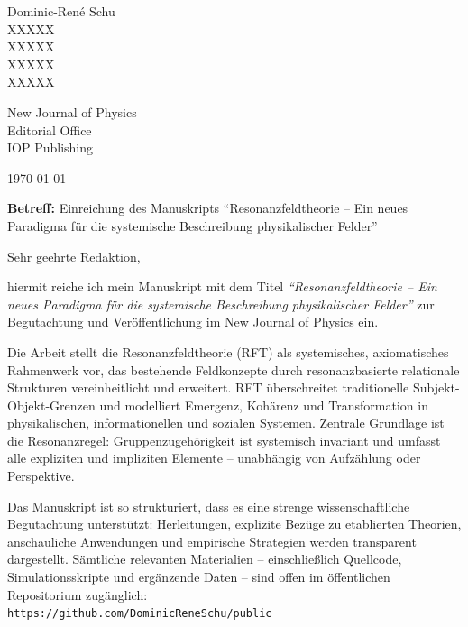 \documentclass[a4paper,12pt]{article}
\begin{document}
	
	\vspace*{-2cm}
	
	Dominic-René Schu\\
	XXXXX\\
	XXXXX\\
	XXXXX\\
	XXXXX\\
	
	\vspace{1cm}
	
	New Journal of Physics\\
	Editorial Office\\
	IOP Publishing
	
	\vspace{1cm}
	
	\today
	
	\vspace{1cm}
	
	\textbf{Betreff:} Einreichung des Manuskripts ``Resonanzfeldtheorie – Ein neues Paradigma für die systemische Beschreibung physikalischer Felder''
	
	\vspace{1cm}
	
	Sehr geehrte Redaktion,
	
	\vspace{0.5cm}
	
	hiermit reiche ich mein Manuskript mit dem Titel \textit{``Resonanzfeldtheorie – Ein neues Paradigma für die systemische Beschreibung physikalischer Felder''} zur Begutachtung und Veröffentlichung im New Journal of Physics ein.
	
	Die Arbeit stellt die Resonanzfeldtheorie (RFT) als systemisches, axiomatisches Rahmenwerk vor, das bestehende Feldkonzepte durch resonanzbasierte relationale Strukturen vereinheitlicht und erweitert. RFT überschreitet traditionelle Subjekt-Objekt-Grenzen und modelliert Emergenz, Kohärenz und Transformation in physikalischen, informationellen und sozialen Systemen. Zentrale Grundlage ist die Resonanzregel: Gruppenzugehörigkeit ist systemisch invariant und umfasst alle expliziten und impliziten Elemente – unabhängig von Aufzählung oder Perspektive.
	
	Das Manuskript ist so strukturiert, dass es eine strenge wissenschaftliche Begutachtung unterstützt: Herleitungen, explizite Bezüge zu etablierten Theorien, anschauliche Anwendungen und empirische Strategien werden transparent dargestellt. Sämtliche relevanten Materialien – einschließlich Quellcode, Simulationsskripte und ergänzende Daten – sind offen im öffentlichen Repositorium zugänglich:\\
	\texttt{https://github.com/DominicReneSchu/public}
	
\end{document}
